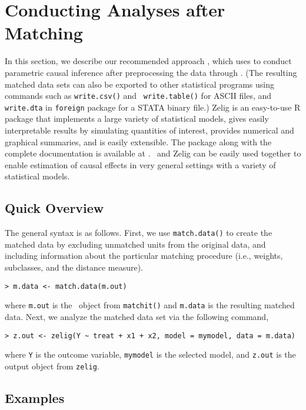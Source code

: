 \section{Conducting Analyses after Matching}
\label{sec:analysis}

In this section, we describe our recommended approach
\citep{HoImaKin05}, which uses
 to conduct parametric
causal inference after preprocessing the data through \MatchIt.  (The
resulting matched data sets can also be exported to other statistical
programs using commands such as {\tt write.csv()} and {\tt
  write.table()} for ASCII files, and {\tt write.dta} in {\tt foreign}
package for a STATA binary file.)  Zelig \citep{ImaKinLau04} is an
easy-to-use R package that implements a large variety of statistical
models, gives easily interpretable results by simulating quantities of
interest, provides numerical and graphical summaries, and is easily
extensible.  The package along with the complete documentation is
available at
.
\MatchIt\ and Zelig can be easily used together to enable estimation
of causal effects in very general settings with a variety of
statistical models.

\subsection{Quick Overview}

The general syntax is as follows. First, we use \texttt{match.data()}
to create the matched data by excluding unmatched units from the
original data, and including information about the particular matching
procedure (i.e., weights, subclasses, and the distance measure).
\begin{verbatim}
> m.data <- match.data(m.out)
\end{verbatim}

where {\tt m.out} is the \MatchIt\ object from {\tt matchit()} and
{\tt m.data} is the resulting matched data.  Next, we analyze the
matched data set via the following command,
\begin{verbatim}
> z.out <- zelig(Y ~ treat + x1 + x2, model = mymodel, data = m.data)
\end{verbatim}

where {\tt Y} is the outcome variable, {\tt mymodel} is the selected
model, and {\tt z.out} is the output object from {\tt zelig}.

\subsection{Examples}

